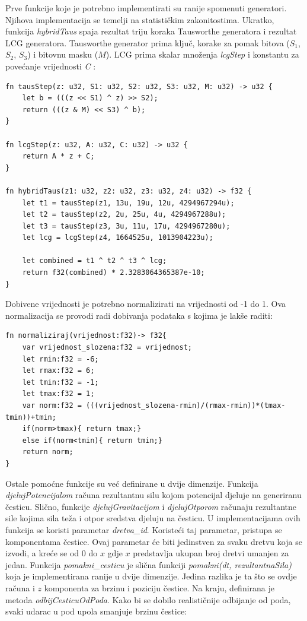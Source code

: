 \documentclass{foi}
\begin{document}
Prve funkcije koje je potrebno implementirati su ranije spomenuti generatori. Njihova implementacija se temelji na statističkim zakonitostima. Ukratko, funkcija \textit{hybridTaus} spaja rezultat triju koraka Tausworthe generatora i rezultat LCG generatora. Tausworthe generator prima ključ, korake za pomak bitova ($S_1$, $S_2$, $S_3$) i bitovnu masku ($M$). LCG prima skalar množenja \textit{lcgStep} i konstantu za povećanje vrijednosti \textit{C} \parencite{NvidiaPRNG}:

\begin{verbatim}
fn tausStep(z: u32, S1: u32, S2: u32, S3: u32, M: u32) -> u32 {
	let b = (((z << S1) ^ z) >> S2);
	return (((z & M) << S3) ^ b);
}

fn lcgStep(z: u32, A: u32, C: u32) -> u32 {
	return A * z + C;
}

fn hybridTaus(z1: u32, z2: u32, z3: u32, z4: u32) -> f32 {
	let t1 = tausStep(z1, 13u, 19u, 12u, 4294967294u);
	let t2 = tausStep(z2, 2u, 25u, 4u, 4294967288u);
	let t3 = tausStep(z3, 3u, 11u, 17u, 4294967280u);
	let lcg = lcgStep(z4, 1664525u, 1013904223u);
	
	let combined = t1 ^ t2 ^ t3 ^ lcg;
	return f32(combined) * 2.3283064365387e-10;
}
\end{verbatim}

Dobivene vrijednosti je potrebno normalizirati na vrijednosti od -1 do 1. Ova normalizacija se provodi radi dobivanja podataka s kojima je lakše raditi\parencite{NormalizacijaPodataka}:
\begin{verbatim}
fn normaliziraj(vrijednost:f32)-> f32{
	var vrijednost_slozena:f32 = vrijednost;
	let rmin:f32 = -6;
	let rmax:f32 = 6;
	let tmin:f32 = -1;
	let tmax:f32 = 1;
	var norm:f32 = (((vrijednost_slozena-rmin)/(rmax-rmin))*(tmax-tmin))+tmin;
	if(norm>tmax){ return tmax;}
	else if(norm<tmin){ return tmin;}
	return norm;
}
\end{verbatim}

Ostale pomoćne funkcije su već definirane u dvije dimenzije. Funkcija \textit{djelujPotencijalom} računa rezultantnu silu kojom potencijal djeluje na generiranu česticu. Slično, funkcije \textit{djelujGravitacijom} i \textit{djelujOtporom} računaju rezultantne sile kojima sila teža i otpor sredstva djeluju na česticu. U implementacijama ovih funkcija se koristi parametar \textit{dretva\_id}. Koristeći taj parametar, pristupa se komponentama čestice. Ovaj parametar će biti jedinstven za svaku dretvu koja se izvodi, a kreće se od 0 do $x$ gdje $x$ predstavlja ukupan broj dretvi umanjen za jedan.  Funkcija \textit{pomakni\_cesticu} je slična funkciji  \textit{pomakni(dt, rezultantnaSila)} koja je implementirana ranije u dvije dimenzije. Jedina razlika je ta što se ovdje računa i $z$ komponenta za brzinu i poziciju čestice. Na kraju, definirana je metoda \textit{odbijCesticuOdPoda}. Kako bi se dobilo realističnije odbijanje od poda, svaki udarac u pod upola smanjuje brzinu čestice:
	
\end{document}
